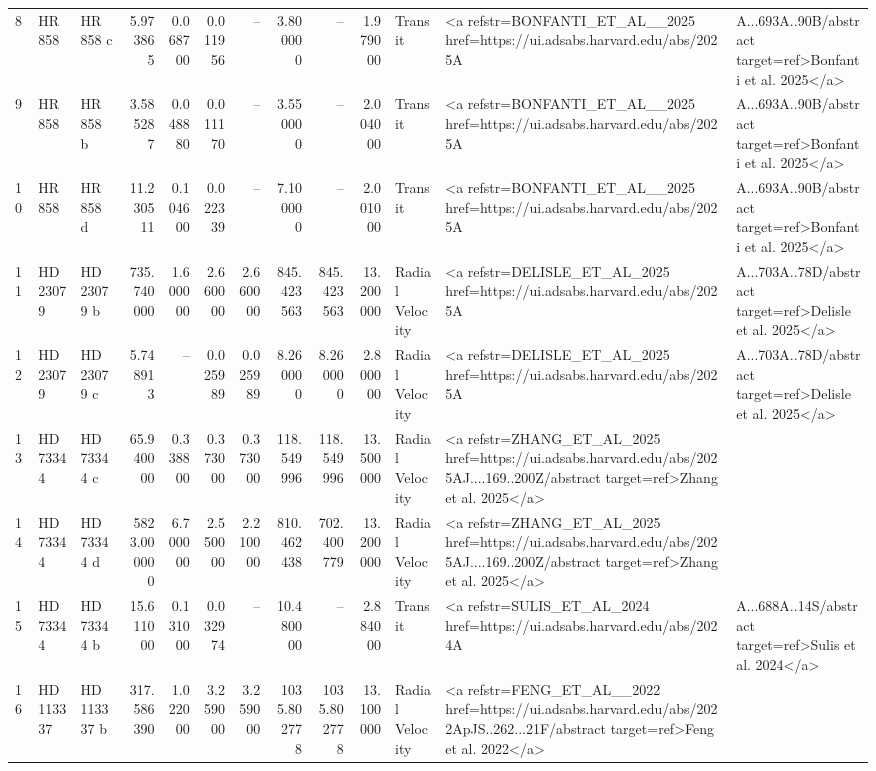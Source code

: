 \begin{tabular}{lllrrrrrrrll}
8 & HR 858 & HR 858 c & 5.973865 & 0.068700 & 0.011956 & -- & 3.800000 & -- & 1.979000 & Transit & <a refstr=BONFANTI_ET_AL__2025 href=https://ui.adsabs.harvard.edu/abs/2025A&A...693A..90B/abstract target=ref>Bonfanti et al. 2025</a> \\
9 & HR 858 & HR 858 b & 3.585287 & 0.048880 & 0.011170 & -- & 3.550000 & -- & 2.004000 & Transit & <a refstr=BONFANTI_ET_AL__2025 href=https://ui.adsabs.harvard.edu/abs/2025A&A...693A..90B/abstract target=ref>Bonfanti et al. 2025</a> \\
10 & HR 858 & HR 858 d & 11.230511 & 0.104600 & 0.022339 & -- & 7.100000 & -- & 2.001000 & Transit & <a refstr=BONFANTI_ET_AL__2025 href=https://ui.adsabs.harvard.edu/abs/2025A&A...693A..90B/abstract target=ref>Bonfanti et al. 2025</a> \\
11 & HD 23079 & HD 23079 b & 735.740000 & 1.600000 & 2.660000 & 2.660000 & 845.423563 & 845.423563 & 13.200000 & Radial Velocity & <a refstr=DELISLE_ET_AL_2025 href=https://ui.adsabs.harvard.edu/abs/2025A&A...703A..78D/abstract target=ref>Delisle et al. 2025</a> \\
12 & HD 23079 & HD 23079 c & 5.748913 & -- & 0.025989 & 0.025989 & 8.260000 & 8.260000 & 2.800000 & Radial Velocity & <a refstr=DELISLE_ET_AL_2025 href=https://ui.adsabs.harvard.edu/abs/2025A&A...703A..78D/abstract target=ref>Delisle et al. 2025</a> \\
13 & HD 73344 & HD 73344 c & 65.940000 & 0.338800 & 0.373000 & 0.373000 & 118.549996 & 118.549996 & 13.500000 & Radial Velocity & <a refstr=ZHANG_ET_AL_2025 href=https://ui.adsabs.harvard.edu/abs/2025AJ....169..200Z/abstract target=ref>Zhang et al. 2025</a> \\
14 & HD 73344 & HD 73344 d & 5823.000000 & 6.700000 & 2.550000 & 2.210000 & 810.462438 & 702.400779 & 13.200000 & Radial Velocity & <a refstr=ZHANG_ET_AL_2025 href=https://ui.adsabs.harvard.edu/abs/2025AJ....169..200Z/abstract target=ref>Zhang et al. 2025</a> \\
15 & HD 73344 & HD 73344 b & 15.611000 & 0.131000 & 0.032974 & -- & 10.480000 & -- & 2.884000 & Transit & <a refstr=SULIS_ET_AL_2024 href=https://ui.adsabs.harvard.edu/abs/2024A&A...688A..14S/abstract target=ref>Sulis et al. 2024</a> \\
16 & HD 113337 & HD 113337 b & 317.586390 & 1.022000 & 3.259000 & 3.259000 & 1035.802778 & 1035.802778 & 13.100000 & Radial Velocity & <a refstr=FENG_ET_AL__2022 href=https://ui.adsabs.harvard.edu/abs/2022ApJS..262...21F/abstract target=ref>Feng et al. 2022</a> \\

\end{tabular}
